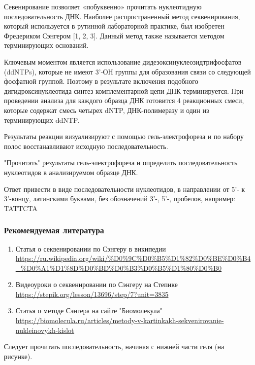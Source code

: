 
Севенирование позволяет «побуквенно» прочитать нуклеотидную  последовательность ДНК. Наиболее распространенный метод секвенирования, который используется в рутинной лабораторной практике, был изобретен Фредериком Сэнгером [1, 2, 3﻿]. Данный метод также называется методом терминирующих оснований.

Ключевым моментом является использование дидезоксинуклеозидтрифосфатов (ddNTPs), которые не имеют 3’-ОН группы для образования связи со следующей фосфатной группой. Поэтому в результате включения подобного дигидроксинуклеотида синтез комплементарной цепи ДНК терминируется. При проведении анализа для каждого образца ДНК готовится 4 реакционных смеси, которые содержат смесь четырех dNTP, ДНК-полимеразу и один из терминирующих ddNTP.

Результаты реакции визуализируют с помощью гель-электрофореза и по набору полос восстанавливают исходную последовательность. 

"Прочитать" результаты гель-электрофореза и определить последовательность нуклеотидов в анализируемом образце ДНК.


Ответ привести в виде последовательности нуклеотидов, в направлении от 5'- к 3'-концу, латинскими буквами, без обозначений 3'-, 5'-, пробелов, например: TATTCTA

\subsubsection*{Рекомендуемая литература}

\begin{enumerate}
    \item Статья о секвенировании по Сэнгеру в википедии \url{https://ru.wikipedia.org/wiki/%D0%9C%D0%B5%D1%82%D0%BE%D0%B4_%D0%A1%D1%8D%D0%BD%D0%B3%D0%B5%D1%80%D0%B0}
    \item Видеоуроки о секвенировании по Сэнгеру на Степике \url{https://stepik.org/lesson/13696/step/7?unit=3835}
    \item Статья о методе Сэнгера на сайте "Биомолекула" \url{ https://biomolecula.ru/articles/metody-v-kartinkakh-sekvenirovanie-nukleinovykh-kislot}
\end{enumerate}

\explanationSection

Следует прочитать последовательность, начиная с нижней части геля (на рисунке).

